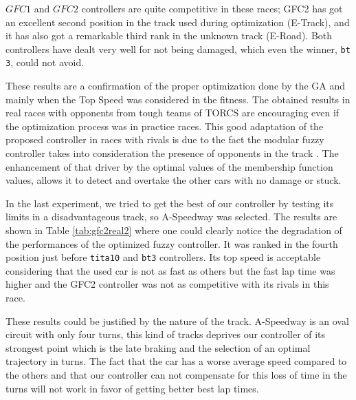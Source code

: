 \documentclass[conference]{IEEEtran}
\begin{document}
$GFC1$ and $GFC2$ controllers are quite competitive in these races; 
GFC2 has got an excellent second position in the track used during optimization (E-Track), and it has also got a remarkable third rank in the unknown track (E-Road). 
Both controllers have dealt very well for not being damaged, which even the winner, {\tt bt 3}, could not avoid. 

These results are a confirmation of the proper optimization done by the GA and mainly when the Top Speed was considered in the fitness. 
The obtained results in real races with opponents from tough teams of TORCS are encouraging even if the optimization process was in practice races.
This good adaptation of the proposed controller in races with rivals is due to the fact the modular fuzzy controller takes into consideration the presence of opponents in the track \cite{evo17}. 
The enhancement of that driver by the optimal values of the membership function values, allows it to detect and overtake the other cars with no damage or stuck.

In the last experiment, we tried to get the best of our controller by testing its limits in a disadvantageous track, so A-Speedway was selected. 
The results are shown in Table \ref{tab:gfc2real2} where one
could clearly notice the degradation of the performances of the
optimized fuzzy controller. It was ranked in the fourth position just before {\tt tita10} and {\tt bt3} controllers. Its top speed is acceptable considering that the used car is not as fast as others but the fast lap time was higher and the GFC2 controller was not as competitive with its rivals in this race. 

These results could be justified by the nature of the track. A-Speedway is an oval circuit with only four turns, this kind of tracks deprives our controller of its strongest point which is the late braking and the selection of an optimal trajectory in turns. 
The fact that the car has a worse average speed compared to the others and that our controller can not compensate for this loss of time in the turns will not work in favor of getting better best lap times.  
\end{document}

